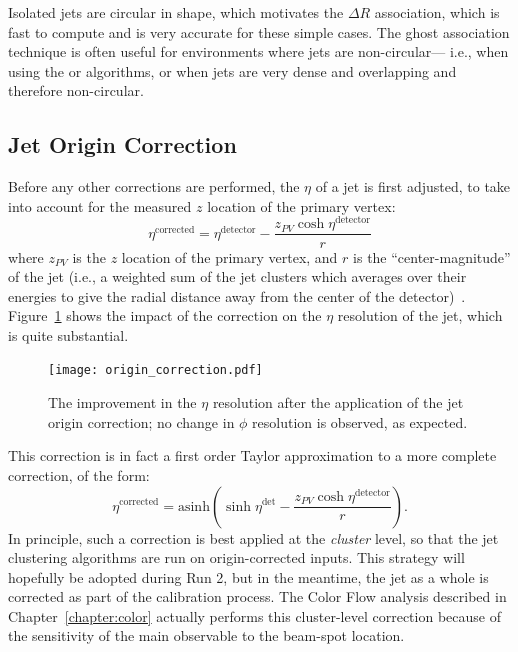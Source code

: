 Isolated \antikt jets are circular in shape, which motivates the $\Delta R$ association, which is fast to compute and is very accurate for these simple cases. The ghost association technique is often useful for environments where jets are non-circular--- i.e., when using the \kt or \ca algorithms, or when jets are very dense and overlapping and therefore non-circular.



\subsection{Jet Origin Correction}
\label{jet-reconstruction:origin}
Before any other corrections are performed, the $\eta$ of a jet is first adjusted, to take into account for the measured $z$ location of the primary vertex:
%
\begin{equation}
\eta^\mathrm{corrected} = \eta^\mathrm{detector} - \frac{z_{PV} \cosh \eta^\mathrm{detector} }{r}
\end{equation}
%
where $z_{PV}$ is the $z$ location of the primary vertex, and $r$ is the ``center-magnitude'' of the jet (i.e., a weighted sum of the jet clusters which averages over their energies to give the radial distance away from the center of the detector)~\cite{JES2011}. Figure~\ref{fig:jet-reconstruction:origin_correction} shows the impact of the correction on the $\eta$ resolution of the jet, which is quite substantial.


\begin{figure}
\centering
\texttt{[image: origin\_correction.pdf]}
\label{fig:jet-reconstruction:origin_correction}
\caption{The improvement in the $\eta$ resolution after the application of the jet origin correction; no change in $\phi$ resolution is observed, as expected.}
\end{figure}


This correction is in fact a first order Taylor approximation to a more complete correction, of the form:
%
\begin{equation}
\eta^\mathrm{corrected} = \mathrm{asinh} \left(\sinh \eta^\mathrm{det} - \frac{z_{PV} \cosh \eta^\mathrm{detector}}{r}  \right).
\end{equation}
%
In principle, such a correction is best applied at the \textit{cluster} level, so that the jet clustering algorithms are run on origin-corrected inputs. This strategy will hopefully be adopted during Run 2, but in the meantime, the jet as a whole is corrected as part of the calibration process. The Color Flow analysis described in Chapter~\ref{chapter:color} actually performs this cluster-level correction because of the sensitivity of the main observable to the beam-spot location.


